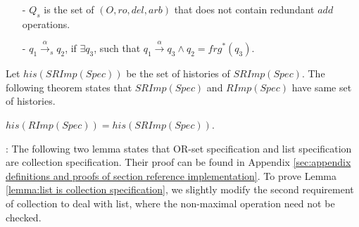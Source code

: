 \begin{itemize}
\setlength{\itemsep}{0.5pt}
\item[-] $Q_s$ is the set of $(O,\mathit{ro},\mathit{del},\mathit{arb})$ that does not contain redundant $\mathit{add}$ operations. %
\item[-] $q_1 {\xrightarrow{\alpha}}_s q_2$, if $\exists q_3$, such that $q_1 {\xrightarrow{\alpha}} q_3 \wedge q_2 = \mathit{frg}^*(q_3)$. %


\end{itemize}




{\color {red}Let $\mathit{his}(\mathit{SRImp}(\mathit{Spec}))$ be the set of histories of $\mathit{SRImp}(\mathit{Spec})$.} The following theorem states that $\mathit{SRImp}(\mathit{Spec})$ and $\mathit{RImp}(\mathit{Spec})$ have same set of histories.
\begin{theorem}
\label{theorem:SRIMPSpec and RIMPSpec have same history}
$\mathit{his}(\mathit{RImp}(\mathit{Spec})) = \mathit{his}(\mathit{SRImp}(\mathit{Spec}))$.
\end{theorem}

: {\color {red}%
The following two lemma states that OR-set specification and list specification are collection specification. Their proof can be found in Appendix \ref{sec:appendix definitions and proofs of section reference implementation}. To prove Lemma \ref{lemma:list is collection specification}, we slightly modify the second requirement of collection to deal with list, where the non-maximal operation need not be checked.  
}




